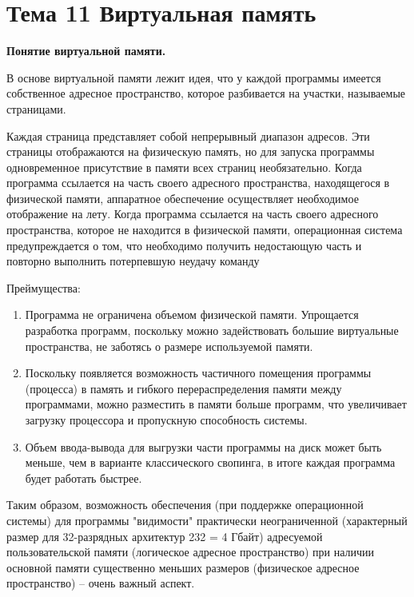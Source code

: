 \newpage 
\chapter{Тема 11 Виртуальная память}

\begin{center}{\bfseries Понятие виртуальной памяти.}
\end{center}

\begin{opr}
  В основе виртуальной памяти лежит идея, что у каждой программы имеется собственное адресное пространство, которое разбивается на участки, называемые страницами.
\end{opr}

Каждая страница представляет собой непрерывный диапазон адресов. Эти страницы отображаются на физическую память, но для запуска программы одновременное присутствие в памяти всех страниц необязательно. Когда программа ссылается на часть своего адресного пространства, находящегося в физической памяти, аппаратное обеспечение осуществляет необходимое отображение на лету. Когда программа ссылается на часть своего адресного пространства, которое не находится в физической памяти, операционная система предупреждается о том, что необходимо получить недостающую часть и повторно выполнить потерпевшую неудачу команду

Преймущества:

\begin{enumerate}
  \item Программа не ограничена объемом физической памяти. Упрощается разработка программ, поскольку можно задействовать большие виртуальные пространства, не заботясь о размере используемой памяти.
  \item Поскольку появляется возможность частичного помещения программы (процесса) в память и гибкого перераспределения памяти между программами, можно разместить в памяти больше программ, что увеличивает загрузку процессора и пропускную способность системы.
  \item Объем ввода-вывода для выгрузки части программы на диск может быть меньше, чем в варианте классического свопинга, в итоге каждая программа будет работать быстрее.
\end{enumerate}

Таким образом, возможность обеспечения (при поддержке операционной системы) для программы "видимости" практически неограниченной (характерный размер для 32-разрядных архитектур 232 = 4 Гбайт) адресуемой пользовательской памяти (логическое адресное пространство) при наличии основной памяти существенно меньших размеров (физическое адресное пространство) – очень важный аспект.

